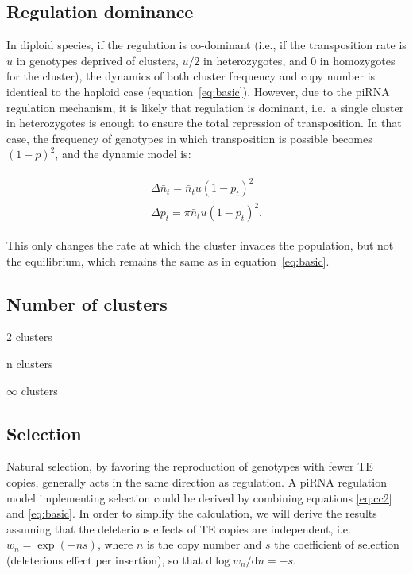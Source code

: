 \documentclass[10pt,a4paper]{article}
\begin{document}
\subsection{Regulation dominance}

In diploid species, if the regulation is co-dominant (i.e., if the transposition rate is $u$ in genotypes deprived of clusters, $u/2$ in heterozygotes, and $0$ in homozygotes for the cluster), the dynamics of both cluster frequency and copy number is identical to the haploid case (equation~\ref{eq:basic}). However, due to the piRNA regulation mechanism, it is likely that regulation is dominant, i.e.\ a single cluster in heterozygotes is enough to ensure the total repression of transposition. In that case, the frequency of genotypes in which transposition is possible becomes $(1-p)^2$, and the dynamic model is:

\begin{align}\label{eq:dom}
\begin{split}
\Delta \bar n_t = \bar n_t u (1-p_t)^2 \\
\Delta p_t = \pi \bar n_t u (1-p_t)^2.
\end{split}
\end{align}

This only changes the rate at which the cluster invades the population, but not the equilibrium, which remains the same as in equation~\ref{eq:basic}. 

\subsection{Number of clusters}

2 clusters

n clusters

$\infty$ clusters

\subsection{Selection}

Natural selection, by favoring the reproduction of genotypes with fewer TE copies, generally acts in the same direction as regulation. A piRNA regulation model implementing selection could be derived by combining equations \ref{eq:cc2} and \ref{eq:basic}. In order to simplify the calculation, we will derive the results assuming that the deleterious effects of TE copies are independent, i.e.\ $w_n = \exp(- n s)$, where $n$ is the copy number and $s$ the coefficient of selection (deleterious effect per insertion), so that $\mathrm{d} \log w_n / \mathrm{d} n = -s$. 
\end{document}
